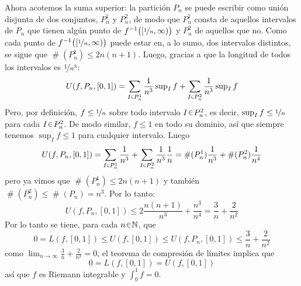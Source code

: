 \begin{sol}
Ahora acotemos la suma superior: la partición $P_n$ se puede escribir como unión disjunta de dos conjuntos, $P^1_n$ y $P^2_n$, de modo que $P^1_n$ consta de aquellos intervalos de $P_n$ que tienen algún punto de $f^{-1}\big([\nicefrac{1}{n},\infty)\big)$ y $P^2_n$ de aquellos que no. Como cada punto de $f^{-1}\big([\nicefrac{1}{n},\infty)\big)$ puede estar en, a lo sumo, dos intervalos distintos, se sigue que $\operatorname{\#}(P^1_n) \leq 2n(n+1)$. Luego, gracias a que la longitud de todos los intervalos es $\nicefrac{1}{n^3}$:
\[
U(f,P_n,[0,1]) = \sum_{I\en P^1_n}\frac{1}{n^3}\sup\nolimits_If +\sum_{I\en P^2_n}\frac{1}{n^3}\sup\nolimits_If
\]
Pero, por definición, $f \leq \nicefrac{1}{n}$ sobre todo intervalo $I\en P^2_n$, es decir, $\sup_I f \leq \nicefrac{1}{n}$ para cada $I\en P^2_n$. De modo similar, $f\leq 1$ en todo su dominio, así que siempre tenemos $\sup_I f \leq 1$ para cualquier intervalo. Luego
\[
U(f,P_n,[0,1])%
= \sum_{I\en P^1_n}\frac{1}{n^3} +\sum_{I\en P^2_n}\frac{1}{n^3}\frac{1}{n}%
= \operatorname{\#}(P^1_n)\frac{1}{n^3} + \operatorname{\#}(P^2_n)\frac{1}{n^4}
\]
pero ya vimos que $\operatorname{\#}(P^1_n) \leq 2n(n+1)$ y también $\operatorname{\#}(P^2_n) \leq \operatorname{\#}(P_n) = n^3$. Por lo tanto:
\[
U(f,P_n,[0,1])%
\leq 2\frac{n(n+1)}{n^3} + \frac{n^3}{n^4}%
= \frac{3}{n} + \frac{2}{n^2}%
\]
Por lo tanto se tiene, para cada $n\en\mathbb{N}$, que 
\[
0 = L(f,[0,1]) \leq U(f,[0,1]) \leq U(f,P_n,[0,1]) \leq \frac{3}{n} + \frac{2}{n^2}
\]
como $\lim_{n\to\infty}\frac{3}{n} + \frac{2}{n^2} = 0$, el teorema de compresión de límites implica que 
\[
0 = L(f,[0,1]) = U(f,[0,1])
\]
así que $f$ es Riemann integrable y $\int^1_0f = 0$.
\end{sol}


